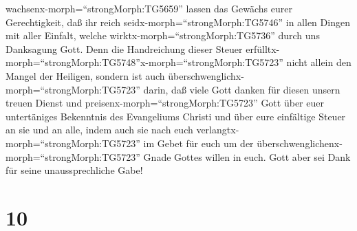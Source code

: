 wachsenx-morph=``strongMorph:TG5659'' lassen das Gewächs eurer
Gerechtigkeit,  daß ihr reich
seidx-morph=``strongMorph:TG5746'' in allen Dingen mit aller Einfalt,
welche wirktx-morph=``strongMorph:TG5736'' durch uns Danksagung Gott.
 Denn die Handreichung dieser Steuer
erfülltx-morph=``strongMorph:TG5748''x-morph=``strongMorph:TG5723''
nicht allein den Mangel der Heiligen, sondern ist auch
überschwenglichx-morph=``strongMorph:TG5723'' darin, daß viele Gott
danken für diesen unsern treuen Dienst  und
preisenx-morph=``strongMorph:TG5723'' Gott über euer untertäniges
Bekenntnis des Evangeliums Christi und über eure einfältige Steuer an
sie und an alle,  indem auch sie nach euch
verlangtx-morph=``strongMorph:TG5723'' im Gebet für euch um der
überschwenglichenx-morph=``strongMorph:TG5723'' Gnade Gottes willen in
euch.  Gott aber sei Dank für seine unaussprechliche Gabe!

\hypertarget{section-9}{%
\section{10}\label{section-9}}


